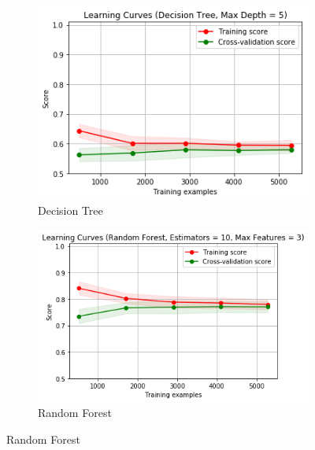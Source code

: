 \begin{figure}[ht!]
\begin{subfigure}{.5\textwidth}
  \centering
  \includegraphics[width=.8\linewidth]{figures/decision-tree.png}
  \caption{Decision Tree}
  \label{fig:sub1}
\end{subfigure}%
\begin{subfigure}{.5\textwidth}
  \centering
  \includegraphics[width=.8\linewidth]{figures/random-forest.png}
  \caption{Random Forest}
  \label{fig:sub2}
\end{subfigure}


\end{figure}
